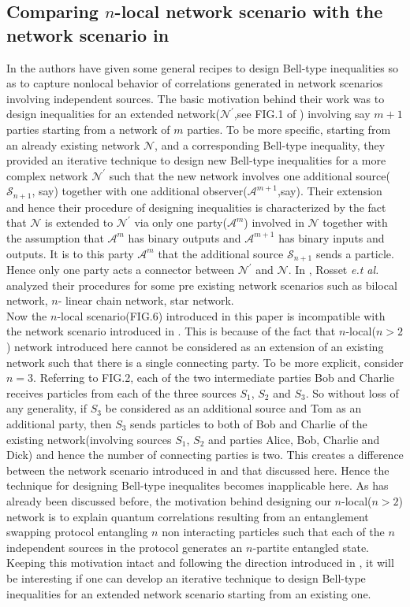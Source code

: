 \documentclass[pra,10pt,twocolumn,superscriptaddress,floatfix,showpacs]{revtex4-1}
\begin{document}
\subsection{Comparing $n$-local network scenario with the network scenario in \cite{den}}
In \cite{den} the authors have given some general recipes  to design Bell-type inequalities so as to capture nonlocal behavior of correlations generated in network scenarios involving independent sources. The basic motivation behind their work was to design inequalities for an extended network($\mathcal{N}^{'}$,see FIG.1 of \cite{den}) involving say $m+1$ parties starting from a network of $m$ parties. To be more specific, starting from an already existing network $\mathcal{N}$, and a corresponding Bell-type inequality, they provided an iterative technique to design new Bell-type inequalities for a more complex network $\mathcal{N}^{'}$ such that the new network  involves one additional source($\mathcal{S}_{n+1}$, say) together with one additional observer($\mathcal{A}^{m+1}$,say). Their extension and hence their procedure of designing inequalities is characterized by the fact that $\mathcal{N}$ is extended to $\mathcal{N}^{'}$ via only one party($\mathcal{A}^{m}$) involved in $\mathcal{N}$ together with the assumption that $\mathcal{A}^{m}$ has binary outputs and $\mathcal{A}^{m+1}$ has binary inputs and outputs. It is to this party $\mathcal{A}^{m}$ that the additional source $\mathcal{S}_{n+1}$ sends a particle. Hence only one party acts a connector between $\mathcal{N}^{'}$ and $\mathcal{N}$. In \cite{den}, Rosset \textit{e.t al.} analyzed their procedures for some pre existing network scenarios such as bilocal network\cite{BRA,BRAN}, $n$- linear chain network, star network\cite{Tav}.\\
Now the $n$-local scenario(FIG.6) introduced in this paper is incompatible with the network scenario introduced in \cite{den}. This is because of the fact that $n$-local($n >2$) network introduced here cannot be considered as an extension of an existing network such that there is a single connecting party. To be more explicit, consider $n=3.$ Referring to FIG.2, each of the two intermediate parties Bob and Charlie receives particles from each of the three sources $S_1$, $S_2$ and $S_3.$ So without loss of any generality, if $S_3$ be considered as an additional source and Tom as an additional party, then $S_3$ sends particles to both of Bob and Charlie of the existing network(involving sources $S_1$, $S_2$ and parties Alice, Bob, Charlie and Dick) and hence the number of connecting parties is two. This creates a difference between the network scenario introduced in \cite{den} and that discussed here. Hence the technique for designing Bell-type inequalites\cite{den} becomes inapplicable here. As has already been discussed before, the motivation behind designing our $n$-local($n>2$) network is to explain quantum correlations resulting from an entanglement swapping protocol entangling $n$ non interacting particles such that each of the $n$ independent sources in the protocol generates an $n$-partite entangled state. Keeping this motivation intact and following the direction introduced in \cite{den}, it will be interesting if one can develop an iterative technique to design Bell-type inequalities for an extended network scenario starting from an existing one.
\end{document}
